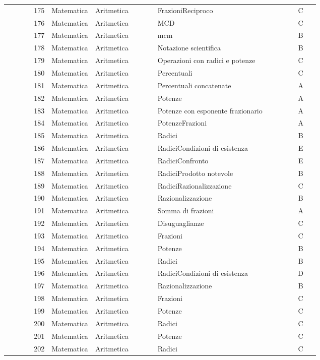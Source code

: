 \documentclass[20pt, a4paper]{article}
\begin{document}
\begin{longtable}{@{}r>{\raggedright\arraybackslash}p{0.14\linewidth}>{\raggedright\arraybackslash}p{0.20\linewidth}>{\raggedright\arraybackslash}p{0.42\linewidth}c@{}}
175 & Matematica & Aritmetica & FrazioniReciproco & C \\
176 & Matematica & Aritmetica & MCD & C \\
177 & Matematica & Aritmetica & mcm & B \\
178 & Matematica & Aritmetica & Notazione scientifica & B \\
179 & Matematica & Aritmetica & Operazioni con radici e potenze & C \\
180 & Matematica & Aritmetica & Percentuali & C \\
181 & Matematica & Aritmetica & Percentuali concatenate & A \\
182 & Matematica & Aritmetica & Potenze & A \\
183 & Matematica & Aritmetica & Potenze con esponente frazionario & A \\
184 & Matematica & Aritmetica & PotenzeFrazioni & A \\
185 & Matematica & Aritmetica & Radici & B \\
186 & Matematica & Aritmetica & RadiciCondizioni di esistenza & E \\
187 & Matematica & Aritmetica & RadiciConfronto & E \\
188 & Matematica & Aritmetica & RadiciProdotto notevole & B \\
189 & Matematica & Aritmetica & RadiciRazionalizzazione & C \\
190 & Matematica & Aritmetica & Razionalizzazione & B \\
191 & Matematica & Aritmetica & Somma di frazioni & A \\
192 & Matematica & Aritmetica & Disuguaglianze & C \\
193 & Matematica & Aritmetica & Frazioni & C \\
194 & Matematica & Aritmetica & Potenze & B \\
195 & Matematica & Aritmetica & Radici & B \\
196 & Matematica & Aritmetica & RadiciCondizioni di esistenza & D \\
197 & Matematica & Aritmetica & Razionalizzazione & B \\
198 & Matematica & Aritmetica & Frazioni & C \\
199 & Matematica & Aritmetica & Potenze & C \\
200 & Matematica & Aritmetica & Radici & C \\
201 & Matematica & Aritmetica & Potenze & C \\
202 & Matematica & Aritmetica & Radici & C \\

\end{longtable}
\end{document}
